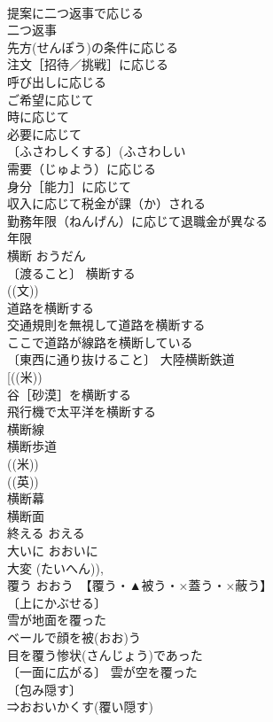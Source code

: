 \documentclass[8pt]{extreport}
\begin{document}
\begin{CJK}{UTF8}{min}
\\	提案に二つ返事で応じる 
\\	二つ返事 
\\	先方(せんぽう)の条件に応じる 
\\	注文［招待／挑戦］に応じる 
\\	呼び出しに応じる 
\\	ご希望に応じて 
\\	時に応じて 
\\	必要に応じて 
\\	〔ふさわしくする〕(ふさわしい　
\\	需要（じゅよう）に応じる 
\\	身分［能力］に応じて 
\\	収入に応じて税金が課（か）される 
\\	勤務年限（ねんげん）に応じて退職金が異なる 
\\	年限　
\\	横断	おうだん	
\\	〔渡ること〕 横断する 
\\	((文)) 
\\	道路を横断する 
\\	交通規則を無視して道路を横断する 
\\	ここで道路が線路を横断している 
\\	〔東西に通り抜けること〕 大陸横断鉄道 
\\	[((米)) 
\\	谷［砂漠］を横断する 
\\	飛行機で太平洋を横断する 
\\	横断線 
\\	横断歩道 
\\	((米)) 
\\	((英)) 
\\	横断幕 
\\	横断面 
\\	終える	おえる	
\\	大いに	おおいに	
\\	大変 (たいへん)), 
\\	覆う	おおう　【覆う・▲被う・×蓋う・×蔽う】	
\\	〔上にかぶせる〕
\\	雪が地面を覆った 
\\	ベールで顔を被(おお)う 
\\	目を覆う惨状(さんじょう)であった 
\\	〔一面に広がる〕 雲が空を覆った 
\\	〔包み隠す〕
\\	⇒おおいかくす(覆い隠す) 

\end{CJK}
\end{document}

